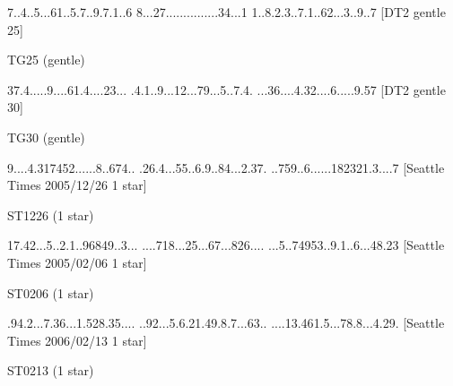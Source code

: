 \documentclass[twoside]{article}
\begin{document}
\renewcommand*{\puzzlefile}{tg25.sud}
\writepuzzle%
{7..4..5..}{.61..5.7.}{.9.7.1..6}%
{8...27...}{.........}{...34...1}%
{1..8.2.3.}{.7.1..62.}{..3..9..7}%
[DT2 gentle 25]
\vfill
\begin{minipage}{0.95\linewidth}\begin{center}
TG25 (gentle) \\
\end{center}\end{minipage}

\renewcommand*{\puzzlefile}{tg30.sud}
\writepuzzle%
{37.4.....}{9....61.4}{....23...}%
{.4.1..9..}{.12...79.}{..5..7.4.}%
{...36....}{4.32....6}{.....9.57}%
[DT2 gentle 30]
\vfill
\begin{minipage}{0.95\linewidth}\begin{center}
TG30 (gentle) \\
\end{center}\end{minipage}

\renewcommand*{\puzzlefile}{st1226.sud}
\writepuzzle%
{9....4.31}{7452.....}{.8..674..}%
{.26.4...5}{5..6.9..8}{4...2.37.}%
{..759..6.}{.....1823}{21.3....7}%
[Seattle Times 2005/12/26 1 star]
\vfill
\begin{minipage}{0.95\linewidth}\begin{center}
ST1226 (1 star) \\
\end{center}\end{minipage}

\renewcommand*{\puzzlefile}{st0206.sud}
\writepuzzle%
{17.42...5}{..2.1..96}{849..3...}%
{....718..}{.25...67.}{..826....}%
{...5..749}{53..9.1..}{6...48.23}%
[Seattle Times 2005/02/06 1 star]
\vfill
\begin{minipage}{0.95\linewidth}\begin{center}
ST0206 (1 star) \\
\end{center}\end{minipage}

\renewcommand*{\puzzlefile}{st0213.sud}
\writepuzzle%
{.94.2...7}{.36...1.5}{28.35....}%
{..92...5.}{6.21.49.8}{.7...63..}%
{....13.46}{1.5...78.}{8...4.29.}%
[Seattle Times 2006/02/13 1 star]
\vfill
\begin{minipage}{0.95\linewidth}\begin{center}
ST0213 (1 star) \\
\end{center}\end{minipage}
\end{document}

